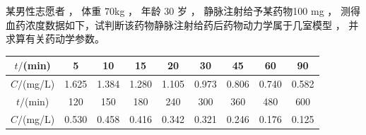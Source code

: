 \documentclass[dvipsnames, svgnames, x11names]{beamer}
\begin{document}
\begin{frame}[t]
    \frametitle{}
    \begin{example}
        某男性志愿者 ， 体重 70kg ， 年龄 30 岁 ， 静脉注射给予某药物100 mg ， 测得血药浓度数据如下，试判断该药物静脉注射给药后药物动力学属于几室模型 ， 并求算有关药动学参数。
        \begin{table}
            \centering
            \begin{tabular}{ccccccccc}
                \bottomrule
                $t/$(min) & 5 & 10 &  15 & 20 & 30 & 45  & 60 & 90 \\ \hline
                $C/$(mg/L) & 1.625 & 1.384 & 1.280 & 1.105 & 0.973 & 0.806 & 0.740 & 0.582 \\ \hline \hline
                $t/$(min) & 120 & 150 & 180  & 240 & 300 & 360 & 480 & 600 \\ \hline
                $C/$(mg/L) & 0.530 & 0.458 & 0.416 & 0.342 & 0.321 & 0.246 & 0.176 & 0.125 \\ \toprule
            \end{tabular}
        \end{table}
    \end{example}
\end{frame}
\end{document}
